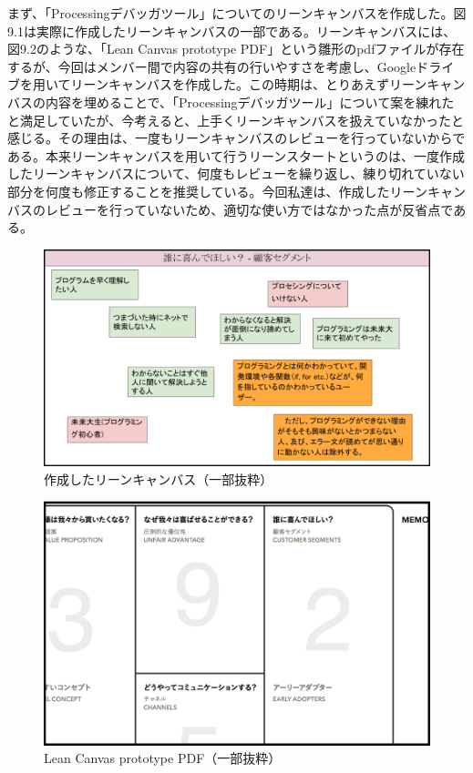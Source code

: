 \documentclass[openany,11pt,papersize]{jsbook}
\begin{document}
\par まず、「Processingデバッガツール」についてのリーンキャンバスを作成した。図9.1は実際に作成したリーンキャンバスの一部である。リーンキャンバスには、図9.2のような、「Lean Canvas prototype PDF」という雛形のpdfファイルが存在するが、今回はメンバー間で内容の共有の行いやすさを考慮し、Googleドライブを用いてリーンキャンバスを作成した。この時期は、とりあえずリーンキャンバスの内容を埋めることで、「Processingデバッガツール」について案を練れたと満足していたが、今考えると、上手くリーンキャンバスを扱えていなかったと感じる。その理由は、一度もリーンキャンバスのレビューを行っていないからである。本来リーンキャンバスを用いて行うリーンスタートというのは、一度作成したリーンキャンバスについて、何度もレビューを繰り返し、練り切れていない部分を何度も修正することを推奨している。今回私達は、作成したリーンキャンバスのレビューを行っていないため、適切な使い方ではなかった点が反省点である。

\begin{figure}[H]
\begin{center}
\includegraphics[width=14cm, bb=0 0 960 540]{img/debuggerLeanCanvas.png}
\end{center}
\caption{作成したリーンキャンバス（一部抜粋）}
\end{figure}

\begin{figure}[H]
\begin{center}
\includegraphics[width=14cm, bb=0 0 1200 760]{img/LeanCanvasTemplate.png}
\end{center}
\caption{Lean Canvas prototype PDF（一部抜粋）}
\end{figure}
\end{document}
